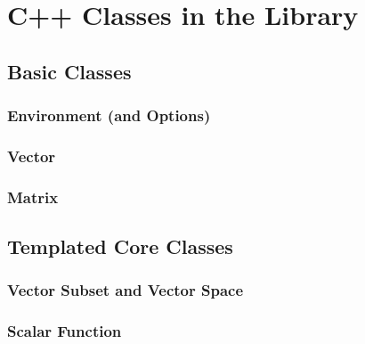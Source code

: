 \chapter{C++ Classes in the Library}\label{ch-classes}
\thispagestyle{headings}



\section{Basic Classes}

\subsection{Environment (and Options)}

\subsection{Vector}

\subsection{Matrix}

\section{Templated Core Classes}

\subsection{Vector Subset and Vector Space}

\subsection{Scalar Function}

